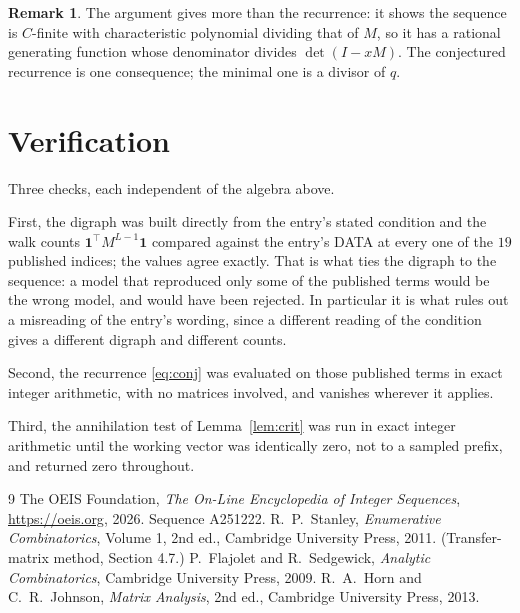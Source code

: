 \documentclass[11pt,a4paper]{article}
\theoremstyle{plain}
\theoremstyle{definition}
\newtheorem{remark}[theorem]{Remark}
\begin{document}
\begin{remark}
The argument gives more than the recurrence: it shows the sequence is $C$-finite with
characteristic polynomial dividing that of $M$, so it has a rational generating function
whose denominator divides $\det(I-xM)$. The conjectured recurrence is one consequence; the
minimal one is a divisor of $q$.
\end{remark}

\section{Verification}

Three checks, each independent of the algebra above.

First, the digraph was built directly from the entry's stated condition and the walk counts
$\mathbf{1}^{\!\top}M^{L-1}\mathbf{1}$ compared against the entry's DATA at
every one of the $19$ published indices; the values agree exactly. That is what ties
the digraph to the sequence: a model that reproduced only some of the published terms would
be the wrong model, and would have been rejected. In particular it is what rules out a
misreading of the entry's wording, since a different reading of the condition gives a
different digraph and different counts.

Second, the recurrence \eqref{eq:conj} was evaluated on those published terms in exact
integer arithmetic, with no matrices involved, and vanishes wherever it applies.

Third, the annihilation test of Lemma~\ref{lem:crit} was run in exact integer arithmetic
until the working vector was identically zero, not to a sampled prefix, and returned zero
throughout.

\begin{thebibliography}{9}
 The OEIS Foundation, \emph{The On-Line Encyclopedia of Integer
Sequences}, \url{https://oeis.org}, 2026. Sequence A251222.
 R.~P.~Stanley, \emph{Enumerative Combinatorics}, Volume 1, 2nd ed.,
Cambridge University Press, 2011. (Transfer-matrix method, Section 4.7.)
 P.~Flajolet and R.~Sedgewick, \emph{Analytic Combinatorics}, Cambridge
University Press, 2009.
 R.~A.~Horn and C.~R.~Johnson, \emph{Matrix Analysis}, 2nd ed., Cambridge
University Press, 2013.
\end{thebibliography}
\end{document}
